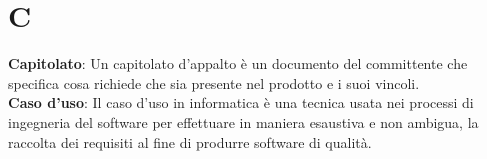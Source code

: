\section{C}
\textbf{Capitolato}: Un capitolato d’appalto è un documento del committente che specifica cosa richiede che
sia presente nel prodotto e i suoi vincoli.\\
\textbf{Caso d'uso}: Il caso d'uso in informatica è una tecnica usata nei processi di ingegneria del software per effettuare in maniera esaustiva e non ambigua, la raccolta dei requisiti al fine di produrre software di qualità.\\

